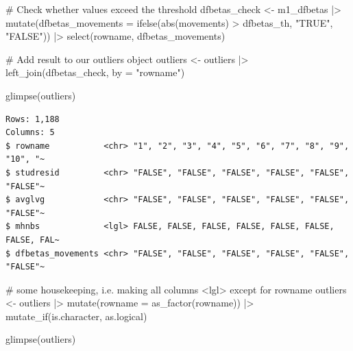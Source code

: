 \documentclass[
  letterpaper,
]{krantz}
\makeatletter
\newenvironment{Shaded}{\begin{snugshade}}{\end{snugshade}}
\newcommand{\AttributeTok}[1]{\textcolor[rgb]{0.40,0.45,0.13}{#1}}
\newcommand{\CommentTok}[1]{\textcolor[rgb]{0.37,0.37,0.37}{#1}}
\newcommand{\FunctionTok}[1]{\textcolor[rgb]{0.28,0.35,0.67}{#1}}
\newcommand{\NormalTok}[1]{\textcolor[rgb]{0.00,0.23,0.31}{#1}}
\newcommand{\OtherTok}[1]{\textcolor[rgb]{0.00,0.23,0.31}{#1}}
\newcommand{\SpecialCharTok}[1]{\textcolor[rgb]{0.37,0.37,0.37}{#1}}
\newcommand{\StringTok}[1]{\textcolor[rgb]{0.13,0.47,0.30}{#1}}
\newenvironment{kframe}{%
\medskip{}
\setlength{\fboxsep}{.8em}
 \def\at@end@of@kframe{}%
 \ifinner\ifhmode%
  \def\at@end@of@kframe{\end{minipage}}%
  \begin{minipage}{\columnwidth}%
 \fi\fi%
 \def\FrameCommand##1{\hskip\@totalleftmargin \hskip-\fboxsep
 \colorbox{shadecolor}{##1}\hskip-\fboxsep
     \hskip-\linewidth \hskip-\@totalleftmargin \hskip\columnwidth}%
 \MakeFramed {\advance\hsize-\width
   \@totalleftmargin\z@ \linewidth\hsize
   \@setminipage}}%
 {\par\unskip\endMakeFramed%
 \at@end@of@kframe}
\renewenvironment{Shaded}{\begin{kframe}}{\end{kframe}}
\makeatother
\begin{document}
\begin{Shaded}
\begin{Highlighting}[]
\CommentTok{\# Check whether values exceed the threshold}
\NormalTok{dfbetas\_check }\OtherTok{\textless{}{-}}
\NormalTok{  m1\_dfbetas }\SpecialCharTok{|\textgreater{}}
  \FunctionTok{mutate}\NormalTok{(}\AttributeTok{dfbetas\_movements =} \FunctionTok{ifelse}\NormalTok{(}\FunctionTok{abs}\NormalTok{(movements) }\SpecialCharTok{\textgreater{}}\NormalTok{ dfbetas\_th,}
                                \StringTok{"TRUE"}\NormalTok{,}
                                \StringTok{"FALSE"}\NormalTok{)) }\SpecialCharTok{|\textgreater{}}
  \FunctionTok{select}\NormalTok{(rowname, dfbetas\_movements)}

\CommentTok{\# Add result to our outliers object}
\NormalTok{outliers }\OtherTok{\textless{}{-}}
\NormalTok{  outliers }\SpecialCharTok{|\textgreater{}}
  \FunctionTok{left\_join}\NormalTok{(dfbetas\_check, }\AttributeTok{by =} \StringTok{"rowname"}\NormalTok{)}

\FunctionTok{glimpse}\NormalTok{(outliers)}
\end{Highlighting}
\end{Shaded}

\begin{verbatim}
Rows: 1,188
Columns: 5
$ rowname           <chr> "1", "2", "3", "4", "5", "6", "7", "8", "9", "10", "~
$ studresid         <chr> "FALSE", "FALSE", "FALSE", "FALSE", "FALSE", "FALSE"~
$ avglvg            <chr> "FALSE", "FALSE", "FALSE", "FALSE", "FALSE", "FALSE"~
$ mhnbs             <lgl> FALSE, FALSE, FALSE, FALSE, FALSE, FALSE, FALSE, FAL~
$ dfbetas_movements <chr> "FALSE", "FALSE", "FALSE", "FALSE", "FALSE", "FALSE"~
\end{verbatim}

\begin{Shaded}
\begin{Highlighting}[]
\CommentTok{\# some housekeeping, i.e. making all columns \textless{}lgl\textgreater{} except for rowname}
\NormalTok{outliers }\OtherTok{\textless{}{-}}
\NormalTok{  outliers }\SpecialCharTok{|\textgreater{}}
  \FunctionTok{mutate}\NormalTok{(}\AttributeTok{rowname =} \FunctionTok{as\_factor}\NormalTok{(rowname)) }\SpecialCharTok{|\textgreater{}}
  \FunctionTok{mutate\_if}\NormalTok{(is.character, as.logical)}

\FunctionTok{glimpse}\NormalTok{(outliers)}
\end{Highlighting}
\end{Shaded}
\end{document}
